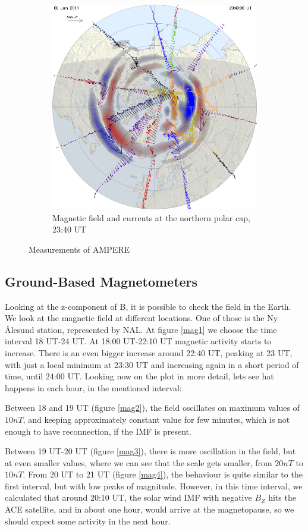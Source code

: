 \documentclass[10pt,a4paper]{article}
\begin{document}
\begin{figure}[h]
	\newpage
	\begin{subfigure}[h]{.5\textwidth}
		\centering
		\includegraphics[width=.8\linewidth]{1294357200north.png}
		\caption{Magnetic field and currents at the northern polar cap, 23:40 UT}
		\label{amp7}
	\end{subfigure}
	\caption{Measurements of AMPERE}
	\label{ampp}
\end{figure}

\subsection{Ground-Based Magnetometers}

Looking at the z-component of B, it is possible to check the field in the Earth. We look at the magnetic field at different locations. One of those is the Ny Ålesund station, represented by NAL. At figure \ref{mag1} we choose the time interval 18 UT-24 UT. At 18:00 UT-22:10 UT magnetic activity starts to increase. There is an even bigger increase around 22:40 UT, peaking at 23 UT, with just a local minimum at 23:30 UT and increasing again in a short period of time, until 24:00 UT. Looking now on the plot in more detail, lets see hat happens in each hour, in the mentioned interval:

Between 18 and 19 UT (figure \ref{mag2}), the field oscillates on maximum values of $10 nT$, and keeping  approximately constant value for few minutes, which is not enough to have reconnection, if the IMF  is present.

Between 19 UT-20 UT (figure \ref{mag3}), there is more oscillation in the field, but at even smaller values, where we can see that the scale gets smaller, from $20 nT$ to $10 nT$.
From 20 UT to 21 UT (figure \ref{mag4}), the behaviour is quite similar to the first interval, but with low peaks of magnitude. However, in this time interval, we calculated that around 20:10 UT, the solar wind IMF with negative $B_Z$ hits the ACE satellite, and in about one hour, would arrive at the magnetopause, so we should expect some activity in the next hour.
\end{document}

